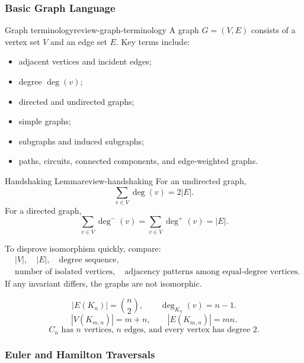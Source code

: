 \subsubsection{Basic Graph Language}

\begin{definition}{Graph terminology}{review-graph-terminology}
A graph \(G=(V,E)\) consists of a vertex set \(V\) and an edge set \(E\). Key terms include:
\begin{itemize}[leftmargin=*]
    \item adjacent vertices and incident edges;
    \item degree \(\deg(v)\);
    \item directed and undirected graphs;
    \item simple graphs;
    \item subgraphs and induced subgraphs;
    \item paths, circuits, connected components, and edge-weighted graphs.
\end{itemize}
\end{definition}

\begin{theorem}{Handshaking Lemma}{review-handshaking}
For an undirected graph,
\[
\sum_{v\in V}\deg(v)=2|E|.
\]
For a directed graph,
\[
\sum_{v\in V}\deg^-(v)=\sum_{v\in V}\deg^+(v)=|E|.
\]
\end{theorem}

\begin{examtip}[title={Fast graph invariant checks}]
To disprove isomorphism quickly, compare:
\[
\begin{aligned}
&|V|,\quad |E|,\quad \text{degree sequence},\\
&\text{number of isolated vertices},\quad
\text{adjacency patterns among equal-degree vertices}.
\end{aligned}
\]
If any invariant differs, the graphs are not isomorphic.
\end{examtip}

\begin{keyformula}[title={Special graph data}]
\[
|E(K_n)|=\binom{n}{2},
\qquad
\deg_{K_n}(v)=n-1.
\]
\[
|V(K_{m,n})|=m+n,
\qquad
|E(K_{m,n})|=mn.
\]
\[
C_n\text{ has }n\text{ vertices, }n\text{ edges, and every vertex has degree }2.
\]
\end{keyformula}

\subsubsection{Euler and Hamilton Traversals}

